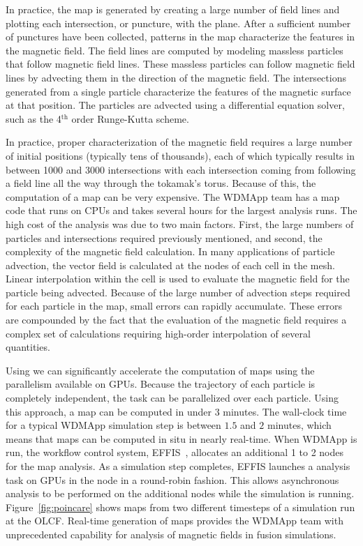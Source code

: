 In practice, the \poincare map is generated by creating a large number of field lines and plotting each intersection, or puncture, with the plane.
After a sufficient number of punctures have been collected, patterns in the map characterize the features in the magnetic field.
The field lines are computed by modeling massless particles that follow magnetic field lines.
These massless particles can follow magnetic field lines by advecting them in the direction of the magnetic field.
The intersections generated from a single particle characterize the features of the magnetic surface at that position.
The particles are advected using a differential equation solver, such as the 4$^{\text{th}}$ order Runge-Kutta scheme.

In practice, proper characterization of the magnetic field requires a large number of initial positions (typically tens of thousands), each of which typically results in between 1000 and 3000 intersections with each intersection coming from following a field line all the way through the tokamak's torus.
Because of this, the computation of a \poincare map can be very expensive.
The WDMApp team has a \poincare map code that runs on CPUs and takes several hours for the largest analysis runs. 
The high cost of the analysis was due to two main factors. First, the large numbers of particles and intersections required previously mentioned, and second, the complexity of the magnetic field calculation.  In many applications of particle advection, the vector field is calculated at the nodes of each cell in the mesh. Linear interpolation within the cell is used to evaluate the magnetic field for the particle being advected. Because of the large number of advection steps required for each particle in the \poincare map, small errors can rapidly accumulate. These errors are compounded by the fact that the evaluation of the magnetic field requires a complex set of calculations requiring high-order interpolation of several quantities.

Using \vtkm we can significantly accelerate the computation of \poincare maps using the parallelism available on GPUs. Because the trajectory of each particle is completely independent, the task can be parallelized over each particle. Using this approach, a \poincare map can be computed in under $3$ minutes. The wall-clock time for a typical WDMApp simulation step is between $1.5$ and $2$ minutes, which means that \poincare maps can be computed in situ in nearly real-time.
When WDMApp is run, the workflow control system, EFFIS~\cite{Suchyta2022:effis}, allocates an additional 1 to 2 nodes for the \poincare map analysis. As a simulation step completes, EFFIS launches a \poincare analysis task on GPUs in the node in a round-robin fashion. This allows asynchronous analysis to be performed on the additional nodes while the simulation is running. Figure~\ref{fig:poincare} shows \poincare maps from two different timesteps of a simulation run at the OLCF.
Real-time generation of \poincare maps provides the WDMApp team with unprecedented capability for analysis of magnetic fields in fusion simulations.



